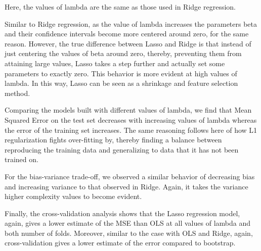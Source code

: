 \documentclass{article}
\begin{document}
Here, the values of lambda are the same as those used in Ridge regression.

Similar to Ridge regression, as the value of lambda increases the parameters beta and their confidence intervals become more centered around zero, for the same reason. However, the true difference between Lasso and Ridge is that instead of just centering the values of beta around zero, thereby, preventing them from attaining large values, Lasso takes a step further and actually set some parameters to exactly zero. This behavior is more evident at high values of lambda. In this way, Lasso can be seen as a shrinkage and feature selection method.

Comparing the models built with different values of lambda, we find that Mean Squared Error on the test set decreases with increasing values of lambda whereas the error of the training set increases. The same reasoning follows here of how L1 regularization fights over-fitting by, thereby finding a balance between reproducing the training data and generalizing to data that it has not been trained on.

For the bias-variance trade-off, we observed a similar behavior of decreasing bias and increasing variance to that observed in Ridge. Again, it takes the variance higher complexity values to become evident.

Finally, the cross-validation analysis shows that the Lasso regression model, again, gives a lower estimate of the MSE than OLS at all values of lambda and both number of folds. Moreover, similar to the case with OLS and Ridge, again, cross-validation gives a lower estimate of the error compared to bootstrap.
\end{document}
